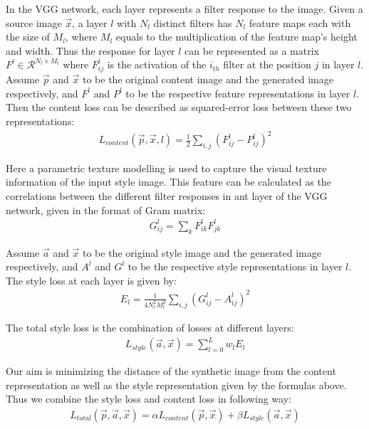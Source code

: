 \documentclass[runningheads]{llncs}
\begin{document}
In the VGG network, each layer represents a filter response to the image. Given a source image $\vec{x}$, a layer $l$ with $N_l$ distinct filters has $N_l$ feature maps each with the size of $M_l$, where $M_l$ equals to the multiplication of the feature map's height and width. Thus the response for layer $l$ can be represented as a matrix $F^l \in \mathcal{R}^{N_l \times M_l}$ where $F^l_{ij}$ is the activation of the $i_{th}$ filter at the position $j$ in layer $l$.
Assume $\vec{p}$ and $\vec{x}$ to be the original content image and the generated image respectively, and $F^l$ and $P^l$ to be the respective feature representations in layer $l$. Then the content loss can be described as squared-error loss between these two representations:
\begin{align}
    L_{content}(\vec{p},\vec{x},l)=\frac{1}{2}\sum_{i,j}(F_{ij}^{l}-P_{ij}^{l})^{2}
\end{align}

Here a parametric texture modelling is used to capture the visual texture information of the input style image. This feature can be calculated as the correlations between the different filter responses in ant layer of the VGG network, given in the format of Gram matrix:
\begin{align}
    G_{ij}^{l}=\sum_{k}F_{ik}^{l}F_{jk}^{l}
\end{align}

Assume $\vec{a}$ and $\vec{x}$ to be the original style image and the generated image respectively, and $A^l$ and $G^l$ to be the respective style representations in layer $l$.
The style loss at each layer is given by:
\begin{align}
    E_{l}=\frac{1}{4N_{l}^{2}M_{l}^{2}}\sum_{i,j}(G_{ij}^{l}-A_{ij}^{l})^{2}
\end{align}

The total style loss is the combination of losses at different layers:
\begin{align}
    L_{style}(\vec{a},\vec{x})=\sum_{l=0}^{L}w_{l}E_{l}
\end{align}

Our aim is minimizing the distance of the synthetic image from the content representation as well as the style representation given by the formulas above. Thus we combine the style loss and content loss in following way:
\begin{align}
    L_{total}(\vec{p},\vec{a},\vec{x})=\alpha L_{content}(\vec{p},\vec{x})+\beta L_{style}(\vec{a},\vec{x})
    \label{eq:loss}
\end{align}
\end{document}
